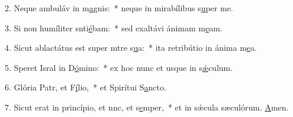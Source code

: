 2. Neque ambuláv in m\uline{a}gnis:~* neque in mirabílibus s\uline{u}per me.\par 
3. Si non humíliter snti\uline{é}bam:~* sed exaltávi ánimam m\uline{e}am.\par 
4. Sicut ablactátus est super mtre s\uline{u}a:~* ita retribútio in ánima m\uline{e}a.\par 
5. Speret Isral in D\uline{ó}mino:~* ex hoc nunc et usque in s\uline{ǽ}culum.\par 
6. Glória Patr, et F\uline{í}lio,~* et Spirítui S\uline{a}ncto.\par 
7. Sicut erat in princípio, et nnc, et s\uline{e}mper,~* et in sǽcula sæculórum. \uline{A}men.\par 

